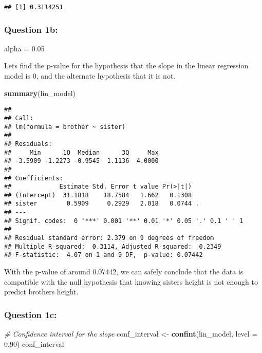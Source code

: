\documentclass[
]{article}
\newenvironment{Shaded}{\begin{snugshade}}{\end{snugshade}}
\newcommand{\AttributeTok}[1]{\textcolor[rgb]{0.13,0.29,0.53}{#1}}
\newcommand{\CommentTok}[1]{\textcolor[rgb]{0.56,0.35,0.01}{\textit{#1}}}
\newcommand{\FloatTok}[1]{\textcolor[rgb]{0.00,0.00,0.81}{#1}}
\newcommand{\FunctionTok}[1]{\textcolor[rgb]{0.13,0.29,0.53}{\textbf{#1}}}
\newcommand{\NormalTok}[1]{#1}
\newcommand{\OtherTok}[1]{\textcolor[rgb]{0.56,0.35,0.01}{#1}}
\begin{document}
\begin{verbatim}
## [1] 0.3114251
\end{verbatim}

\hypertarget{question-1b}{%
\subsubsection{Question 1b:}\label{question-1b}}

alpha = 0.05

Lets find the p-value for the hypothesis that the slope in the linear
regression model is 0, and the alternate hypothesis that it is not.

\begin{Shaded}
\begin{Highlighting}[]
\FunctionTok{summary}\NormalTok{(lin\_model)}
\end{Highlighting}
\end{Shaded}

\begin{verbatim}
## 
## Call:
## lm(formula = brother ~ sister)
## 
## Residuals:
##     Min      1Q  Median      3Q     Max 
## -3.5909 -1.2273 -0.9545  1.1136  4.0000 
## 
## Coefficients:
##             Estimate Std. Error t value Pr(>|t|)  
## (Intercept)  31.1818    18.7584   1.662   0.1308  
## sister        0.5909     0.2929   2.018   0.0744 .
## ---
## Signif. codes:  0 '***' 0.001 '**' 0.01 '*' 0.05 '.' 0.1 ' ' 1
## 
## Residual standard error: 2.379 on 9 degrees of freedom
## Multiple R-squared:  0.3114, Adjusted R-squared:  0.2349 
## F-statistic:  4.07 on 1 and 9 DF,  p-value: 0.07442
\end{verbatim}

With the p-value of around 0.07442, we can safely conclude that the data
is compatible with the null hypothesis that knowing sisters height is
not enough to predict brothers height.

\hypertarget{question-1c}{%
\subsubsection{Question 1c:}\label{question-1c}}

\begin{Shaded}
\begin{Highlighting}[]
\CommentTok{\# Confidence interval for the slope}
\NormalTok{conf\_interval }\OtherTok{\textless{}{-}} \FunctionTok{confint}\NormalTok{(lin\_model, }\AttributeTok{level =} \FloatTok{0.90}\NormalTok{)}
\NormalTok{conf\_interval}
\end{Highlighting}
\end{Shaded}
\end{document}
